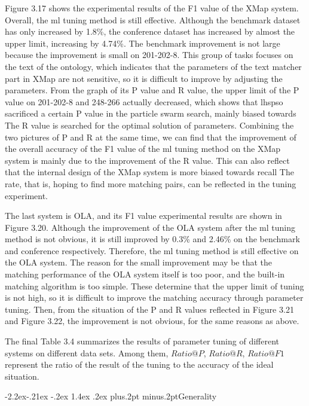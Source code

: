 \documentclass[twoside]{article}
\makeatletter
\def\subsubsection{\@startsection{subsubsection}{3}{\z@}%
 {-2.2ex\@plus -.21ex \@minus -.2ex}%
 {1.4ex \@plus.2ex}
{\normalfont\normalsize\protect\baselineskip=12pt plus.2pt minus.2pt\sl}}
\makeatother
\begin{document}
Figure 3.17 shows the experimental results of the F1 value of the XMap system.
Overall, the ml tuning method is still effective. Although the benchmark dataset has only increased by 1.8\%, the conference dataset has increased by almost the upper limit, increasing by 4.74\%.
The benchmark improvement is not large because the improvement is small on 201-202-8. This group of tasks focuses on the text of the ontology, which indicates that the parameters of the text matcher part in XMap are not sensitive, so it is difficult to improve by adjusting the parameters.
From the graph of its P value and R value, the upper limit of the P value on 201-202-8 and 248-266 actually decreased, which shows that lhspso sacrificed a certain P value in the particle swarm search, mainly biased towards The R value is searched for the optimal solution of parameters.
Combining the two pictures of P and R at the same time, we can find that the improvement of the overall accuracy of the F1 value of the ml tuning method on the XMap system is mainly due to the improvement of the R value. This can also reflect that the internal design of the XMap system is more biased towards recall The rate, that is, hoping to find more matching pairs, can be reflected in the tuning experiment.

The last system is OLA, and its F1 value experimental results are shown in Figure 3.20.
Although the improvement of the OLA system after the ml tuning method is not obvious, it is still improved by 0.3\% and 2.46\% on the benchmark and conference respectively. Therefore, the ml tuning method is still effective on the OLA system.
The reason for the small improvement may be that the matching performance of the OLA system itself is too poor, and the built-in matching algorithm is too simple. These determine that the upper limit of tuning is not high, so it is difficult to improve the matching accuracy through parameter tuning.
Then, from the situation of the P and R values reflected in Figure 3.21 and Figure 3.22, the improvement is not obvious, for the same reasons as above.

The final Table 3.4 summarizes the results of parameter tuning of different systems on different data sets. Among them, $Ratio@P$, $Ratio@R$, $Ratio@F1$ represent the ratio of the result of the tuning to the accuracy of the ideal situation.


\subsubsection{Generality}
\end{document}
